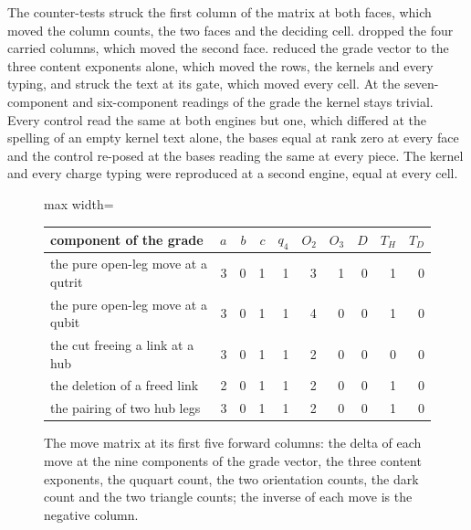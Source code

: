 \begin{chproof}[exact]
The counter-tests struck the first column of the matrix at both faces, which moved the column counts, the two faces and the deciding cell. dropped the four carried columns, which moved the second face. reduced the grade vector to the three content exponents alone, which moved the rows, the kernels and every typing, and struck the text at its gate, which moved every cell. At the seven-component and six-component readings of the grade the kernel stays trivial. Every control read the same at both engines but one, which differed at the spelling of an empty kernel text alone, the bases equal at rank zero at every face and the control re-posed at the bases reading the same at every piece. The kernel and every charge typing were reproduced at a second engine, equal at every cell.
\end{chproof}
\begin{figure}[h]\centering
\begin{adjustbox}{max width=\linewidth}\begin{tabular}{lrrrrrrrrr}\toprule
component of the grade & $a$ & $b$ & $c$ & $q_4$ & $O_2$ & $O_3$ & $D$ & $T_H$ & $T_D$ \\ \midrule
the pure open-leg move at a qutrit & 3 & 0 & 1 & 1 & 3 & 1 & 0 & 1 & 0 \\
the pure open-leg move at a qubit & 3 & 0 & 1 & 1 & 4 & 0 & 0 & 1 & 0 \\
the cut freeing a link at a hub & 3 & 0 & 1 & 1 & 2 & 0 & 0 & 0 & 0 \\
the deletion of a freed link & 2 & 0 & 1 & 1 & 2 & 0 & 0 & 1 & 0 \\
the pairing of two hub legs & 3 & 0 & 1 & 1 & 2 & 0 & 0 & 1 & 0 \\ \bottomrule
\end{tabular}\end{adjustbox}
\caption{The move matrix at its first five forward columns: the delta of each move at the nine components of the grade vector, the three content exponents, the ququart count, the two orientation counts, the dark count and the two triangle counts; the inverse of each move is the negative column.}
\end{figure}
